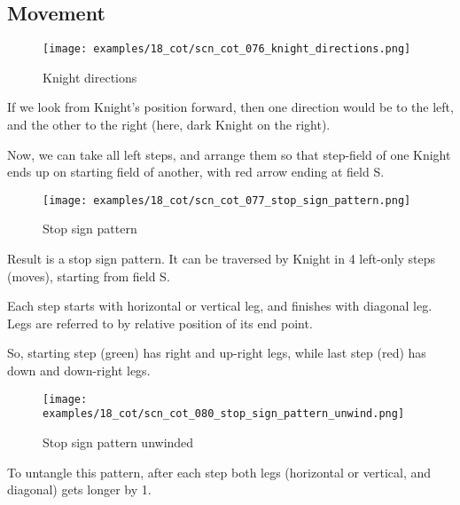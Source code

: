 \subsection*{Movement}
\label{sec:Conquest of Tlalocan/Trance-journey/Movement}

\noindent
\begin{wrapfigure}[10]{l}{0.4\textwidth}
\centering
\texttt{[image: examples/18\_cot/scn\_cot\_076\_knight\_directions.png]}
\vspace*{-0.4\baselineskip}
\caption{Knight directions}
\label{fig:scn_cot_076_knight_directions}
\end{wrapfigure}
If we look from Knight's position forward, then one direction would be to
the left, and the other to the right (here, dark Knight on the right).

Now, we can take all left steps, and arrange them so that step-field of one
Knight ends up on starting field of another, with red arrow ending at field S.


\vspace*{3.7\baselineskip}
\noindent
\begin{wrapfigure}[12]{l}{0.4\textwidth}
\centering
\texttt{[image: examples/18\_cot/scn\_cot\_077\_stop\_sign\_pattern.png]}
\vspace*{-0.4\baselineskip}
\caption{Stop sign pattern}
\label{fig:scn_cot_077_stop_sign_pattern}
\end{wrapfigure}
Result is a stop sign pattern. It can be traversed by Knight in 4 left-only
steps (moves), starting from field S.

Each step starts with horizontal or vertical leg, and finishes with diagonal
leg. Legs are referred to by relative position of its end point.

So, starting step (green) has right and up-right legs, while last step (red)
has down and down-right legs.

\clearpage %

\noindent
\begin{wrapfigure}{l}{0.4\textwidth} %
\centering
\texttt{[image: examples/18\_cot/scn\_cot\_080\_stop\_sign\_pattern\_unwind.png]}
\caption{Stop sign pattern unwinded}
\label{fig:scn_cot_080_stop_sign_pattern_unwind}
\end{wrapfigure}
To untangle this pattern, after each step both legs (horizontal or vertical,
and diagonal) gets longer by 1.

